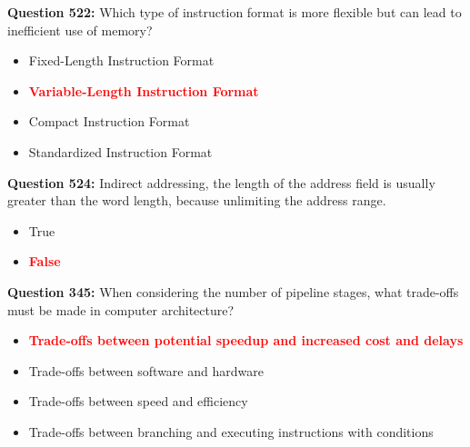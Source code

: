 \documentclass[12pt,a4paper]{article}
\begin{document}
\vspace{0.5cm}

\vspace{0.5cm}

\textbf{Question 522:} Which type of instruction format is more flexible but can lead to inefficient use of memory?

\begin{itemize}
    \item[\textbf{A.}] Fixed-Length Instruction Format
    \item[\textbf{B.}] \textcolor{red}{\textbf{Variable-Length Instruction Format}}
    \item[\textbf{C.}] Compact Instruction Format
    \item[\textbf{D.}] Standardized Instruction Format
\end{itemize}

\vspace{0.5cm}

\vspace{0.5cm}

\textbf{Question 524:} Indirect addressing, the length of the address field is usually greater than the word length, because unlimiting the address range.

\begin{itemize}
    \item[\textbf{A.}] True
    \item[\textbf{B.}] \textcolor{red}{\textbf{False}}
\end{itemize}

\vspace{0.5cm}

\vspace{0.5cm}

\textbf{Question 345:} When considering the number of pipeline stages, what trade-offs must be made in computer architecture?

\begin{itemize}
    \item[\textbf{A.}] \textcolor{red}{\textbf{Trade-offs between potential speedup and increased cost and delays}}
    \item[\textbf{B.}] Trade-offs between software and hardware
    \item[\textbf{C.}] Trade-offs between speed and efficiency
    \item[\textbf{D.}] Trade-offs between branching and executing instructions with conditions
\end{itemize}
\end{document}
